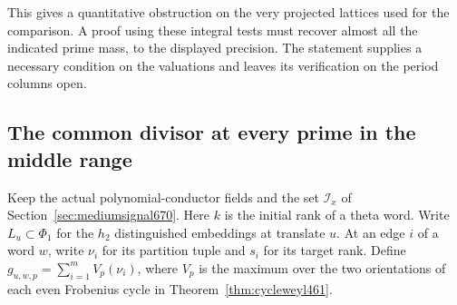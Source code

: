 \documentclass[a4paper,11pt]{article}
\theoremstyle{definition}
\theoremstyle{remark}
\numberwithin{equation}{section}
\begin{document}
This gives a quantitative obstruction on the very projected
lattices used for the comparison. A proof using these integral
tests must recover almost all the indicated prime mass, to the
displayed precision. The statement supplies a necessary condition
on the valuations and leaves its verification on the period
columns open.


\subsection{The common divisor at every prime in the middle range}
\label{sec:commonsaturation672}

Keep the actual polynomial-conductor fields and the set
\(\mathcal I_x\) of Section~\ref{sec:mediumsignal670}. Here \(k\)
is the initial rank of a theta word. Write \(L_u\subset\Phi_1\)
for the \(h_2\) distinguished embeddings at translate \(u\).
At an edge \(i\) of a word \(w\), write \(\nu_i\) for its
partition tuple and \(s_i\) for its target rank. Define
\(g_{u,w,p}=\sum_{i=1}^m V_p(\nu_i)\), where
\(V_p\) is the maximum over the two orientations of each even
Frobenius cycle in Theorem~\ref{thm:cycleweyl461}.
\end{document}
